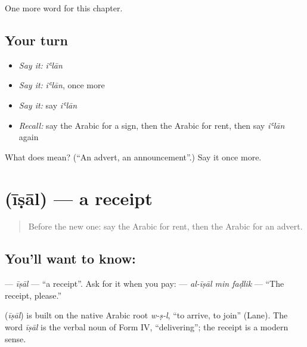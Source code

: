 \begin{grammarlens}[title={What you've built}]
One more word for this chapter.
\end{grammarlens}

\subsection*{Your turn}
\begin{itemize}
\raggedright
  \item \emph{Say it:} \emph{iʿlān}
  \item \emph{Say it:} \emph{iʿlān}, once more
  \item \emph{Say it:} say \emph{iʿlān}
  \item \emph{Recall:} say the Arabic for a sign, then the Arabic for rent, then say \emph{iʿlān} again
\end{itemize}

\begin{tcolorbox}[breakable,colback=teal!4,colframe=teal!35!black,title={Before you move on}]
What does  mean? (\textquotedblleft{}An advert, an announcement\textquotedblright{}.) Say it once more.
\end{tcolorbox}
\section[\texorpdfstring{\ar{إيصال} (īṣāl)}{إيصال (īṣāl)}]{ (īṣāl) — a receipt}

\label{lesson:AR-C158-isal}



\begin{quote}
Before the new one: say the Arabic for rent, then the Arabic for an advert.
\end{quote}

\subsection*{You'll want to know: }
\textbf{} — \emph{īṣāl} — \textquotedblleft{}a receipt\textquotedblright{}. Ask for it when you pay: \textbf{  } — \emph{al-īṣāl min faḍlik} — \textquotedblleft{}The receipt, please.\textquotedblright{}

\begin{cousinweb}
\textbf{} (\emph{īṣāl}) is built on the native Arabic root \emph{w-ṣ-l}, \textquotedblleft{}to arrive, to join\textquotedblright{} (Lane). The word \emph{īṣāl} is the verbal noun of Form IV, \textquotedblleft{}delivering\textquotedblright{}; the receipt is a modern sense.
\end{cousinweb}

